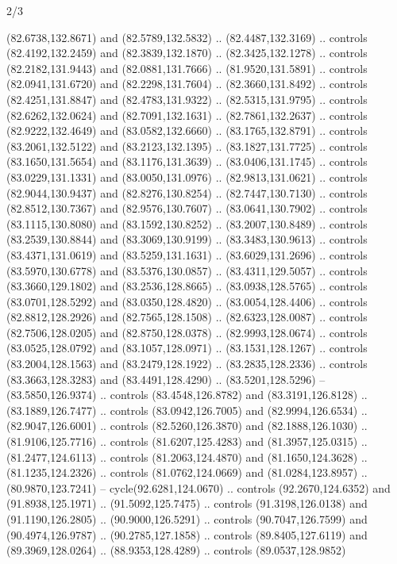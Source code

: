 \begin{flagdescription}{2/3}
\begin{scope}[shift={(0.5\flaglength,0.5)},scale=\flagwidth/320]
\begin{scope}[y=0.8pt, x=0.8pt, yscale=-1,shift={(-118.3,-146)}]
  (82.6738,132.8671) and (82.5789,132.5832) .. (82.4487,132.3169) .. controls
  (82.4192,132.2459) and (82.3839,132.1870) .. (82.3425,132.1278) .. controls
  (82.2182,131.9443) and (82.0881,131.7666) .. (81.9520,131.5891) .. controls
  (82.0941,131.6720) and (82.2298,131.7604) .. (82.3660,131.8492) .. controls
  (82.4251,131.8847) and (82.4783,131.9322) .. (82.5315,131.9795) .. controls
  (82.6262,132.0624) and (82.7091,132.1631) .. (82.7861,132.2637) .. controls
  (82.9222,132.4649) and (83.0582,132.6660) .. (83.1765,132.8791) .. controls
  (83.2061,132.5122) and (83.2123,132.1395) .. (83.1827,131.7725) .. controls
  (83.1650,131.5654) and (83.1176,131.3639) .. (83.0406,131.1745) .. controls
  (83.0229,131.1331) and (83.0050,131.0976) .. (82.9813,131.0621) .. controls
  (82.9044,130.9437) and (82.8276,130.8254) .. (82.7447,130.7130) .. controls
  (82.8512,130.7367) and (82.9576,130.7607) .. (83.0641,130.7902) .. controls
  (83.1115,130.8080) and (83.1592,130.8252) .. (83.2007,130.8489) .. controls
  (83.2539,130.8844) and (83.3069,130.9199) .. (83.3483,130.9613) .. controls
  (83.4371,131.0619) and (83.5259,131.1631) .. (83.6029,131.2696) .. controls
  (83.5970,130.6778) and (83.5376,130.0857) .. (83.4311,129.5057) .. controls
  (83.3660,129.1802) and (83.2536,128.8665) .. (83.0938,128.5765) .. controls
  (83.0701,128.5292) and (83.0350,128.4820) .. (83.0054,128.4406) .. controls
  (82.8812,128.2926) and (82.7565,128.1508) .. (82.6323,128.0087) .. controls
  (82.7506,128.0205) and (82.8750,128.0378) .. (82.9993,128.0674) .. controls
  (83.0525,128.0792) and (83.1057,128.0971) .. (83.1531,128.1267) .. controls
  (83.2004,128.1563) and (83.2479,128.1922) .. (83.2835,128.2336) .. controls
  (83.3663,128.3283) and (83.4491,128.4290) .. (83.5201,128.5296) --
  (83.5850,126.9374) .. controls (83.4548,126.8782) and (83.3191,126.8128) ..
  (83.1889,126.7477) .. controls (83.0942,126.7005) and (82.9994,126.6534) ..
  (82.9047,126.6001) .. controls (82.5260,126.3870) and (82.1888,126.1030) ..
  (81.9106,125.7716) .. controls (81.6207,125.4283) and (81.3957,125.0315) ..
  (81.2477,124.6113) .. controls (81.2063,124.4870) and (81.1650,124.3628) ..
  (81.1235,124.2326) .. controls (81.0762,124.0669) and (81.0284,123.8957) ..
  (80.9870,123.7241) -- cycle(92.6281,124.0670) .. controls (92.2670,124.6352)
  and (91.8938,125.1971) .. (91.5092,125.7475) .. controls (91.3198,126.0138)
  and (91.1190,126.2805) .. (90.9000,126.5291) .. controls (90.7047,126.7599)
  and (90.4974,126.9787) .. (90.2785,127.1858) .. controls (89.8405,127.6119)
  and (89.3969,128.0264) .. (88.9353,128.4289) .. controls (89.0537,128.9852)

\end{scope}
\end{scope}
\end{flagdescription}
